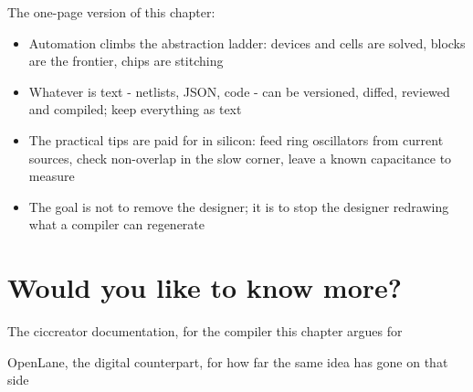 The one-page version of this chapter:

\begin{itemize}
\tightlist
\item
  Automation climbs the abstraction ladder: devices and cells are
  solved, blocks are the frontier, chips are stitching
\item
  Whatever is text - netlists, JSON, code - can be versioned, diffed,
  reviewed and compiled; keep everything as text
\item
  The practical tips are paid for in silicon: feed ring oscillators from
  current sources, check non-overlap in the slow corner, leave a known
  capacitance to measure
\item
  The goal is not to remove the designer; it is to stop the designer
  redrawing what a compiler can regenerate
\end{itemize}

\section{Would you like to know
more?}\label{would-you-like-to-know-more}

The ciccreator documentation, for the compiler this chapter argues for

OpenLane, the digital counterpart, for how far the same idea has gone on
that side
